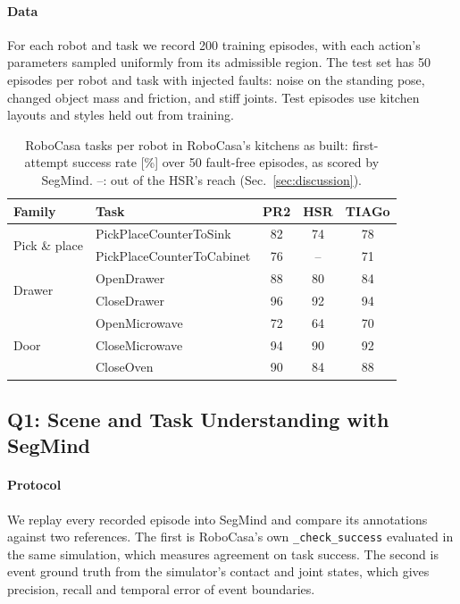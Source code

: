 \documentclass[letterpaper, 10 pt, conference]{ieeeconf}
\newcommand{\dummystyle}{\color{dummy}}
\newcommand{\dummystyle}{}
\newcommand{\dummy}[1]{{\dummystyle #1}}
\newcommand{\robocasa}{RoboCasa}
\newcommand{\segmind}{SegMind}
\begin{document}
\paragraph*{Data}
For each robot and task we record \dummy{200} training episodes, with each
action's parameters sampled uniformly from its admissible region. The test set
has \dummy{50} episodes per robot and task with injected faults: noise on the
standing pose, changed object mass and friction, and stiff joints. Test episodes
use kitchen layouts and styles held out from training.

\begin{table}[t]
  \centering
  \caption{\robocasa{} tasks per robot in \robocasa{}'s kitchens as built:
  first-attempt success rate [\%] over \dummy{50} fault-free episodes, as
  scored by \segmind{}. --: out of the HSR's reach (Sec.~\ref{sec:discussion}).}
  \label{tab:tasks}
  \setlength{\tabcolsep}{4pt}
  \dummystyle
  \begin{tabular}{llccc}
    \toprule
    Family & Task & PR2 & HSR & TIAGo \\
    \midrule
    \multirow{2}{*}{Pick \& place}
      & PickPlaceCounterToSink    & 82 & 74 & 78 \\
      & PickPlaceCounterToCabinet & 76 & -- & 71 \\
    \midrule
    \multirow{2}{*}{Drawer}
      & OpenDrawer  & 88 & 80 & 84 \\
      & CloseDrawer & 96 & 92 & 94 \\
    \midrule
    \multirow{3}{*}{Door}
      & OpenMicrowave  & 72 & 64 & 70 \\
      & CloseMicrowave & 94 & 90 & 92 \\
      & CloseOven      & 90 & 84 & 88 \\
    \bottomrule
  \end{tabular}
\end{table}

\subsection{Q1: Scene and Task Understanding with \segmind{}}
\label{sec:exp-segmind}

\paragraph*{Protocol}
We replay every recorded episode into \segmind{} and compare its annotations
against two references. The first is \robocasa{}'s own \texttt{\_check\_success}
evaluated in the same simulation, which measures agreement on task success. The
second is event ground truth from the simulator's contact and joint states, which
gives precision, recall and temporal error of event boundaries.
\end{document}
